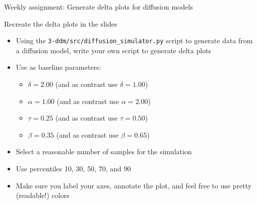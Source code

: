 \documentclass[aspectratio=169]{beamer}
\begin{document}
\begin{frame}[fragile]{Weekly assignment: Generate delta plots for diffusion models}

Recreate the delta plots in the slides
\begin{itemize}
\item Using the \texttt{3-ddm/src/diffusion\_simulator.py} script to generate data from a diffusion model, write your own script to generate delta plots
\item Use as baseline parameters:
\begin{itemize}
\item $\delta = 2.00$ (and as contrast use $\delta = 1.00$)
\item $\alpha = 1.00$ (and as contrast use $\alpha = 2.00$)
\item $\tau = 0.25$ (and as contrast use $\tau = 0.50$)
\item $\beta = 0.35$ (and as contrast use $\beta = 0.65$)
\end{itemize}
\item Select a reasonable number of samples for the simulation
\item Use percentiles 10, 30, 50, 70, and 90
\item Make sure you label your axes, annotate the plot, and feel free to use pretty (readable!) colors
\end{itemize}

\end{frame}

%
%


\maketitle
\end{document}
